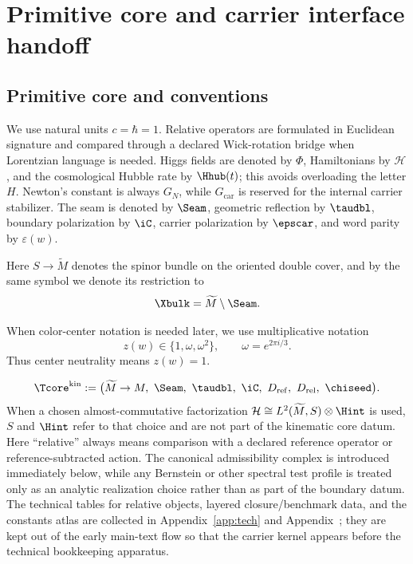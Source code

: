 
\section{Primitive core and carrier interface handoff}

\subsection{Primitive core and conventions}

We use natural units $c=\hbar=1$. Relative operators are formulated in Euclidean signature and compared through a declared Wick-rotation bridge when Lorentzian language is needed. Higgs fields are denoted by $\Phi$, Hamiltonians by $\mathcal H$, and the cosmological Hubble rate by $\Hhub(t)$; this avoids overloading the letter $H$. Newton's constant is always $G_N$, while $G_{\mathrm{car}}$ is reserved for the internal carrier stabilizer. The seam is denoted by $\Seam$, geometric reflection by $\taudbl$, boundary polarization by $\iC$, carrier polarization by $\epscar$, and word parity by $\varepsilon(w)$.

Here $S\to \widetilde M$ denotes the spinor bundle on the oriented double cover, and by the same symbol we denote its restriction to
\[
\Xbulk=\widetilde M\setminus\Seam.
\]

When color-center notation is needed later, we use multiplicative notation
\[
z(w)\in\{1,\omega,\omega^2\},
\qquad
\omega=e^{2\pi i/3}.
\]
Thus center neutrality means $z(w)=1$.

\[
\Tcore^{\mathrm{kin}}
:=
\bigl(
\widetilde M\to M,\ \Seam,\ \taudbl,\ \iC,\ D_{\mathrm{ref}},\ D_{\mathrm{rel}},\ \chiseed
\bigr).
\]
When a chosen almost-commutative factorization
$\mathcal H\cong L^2(\widetilde M,S)\otimes\Hint$ is used, $S$ and $\Hint$ refer to that
choice and are not part of the kinematic core datum.
Here \enquote{relative} always means comparison with a declared reference operator or
reference-subtracted action. The canonical admissibility complex is introduced immediately below,
while any Bernstein or other spectral test profile is treated only as an analytic realization
choice rather than as part of the boundary datum. The technical tables for relative objects,
layered closure/benchmark data, and the constants atlas are collected in
Appendix~\ref{app:tech} and Appendix~; they are kept out of the early
main-text flow so that the carrier kernel appears before the technical bookkeeping apparatus.

